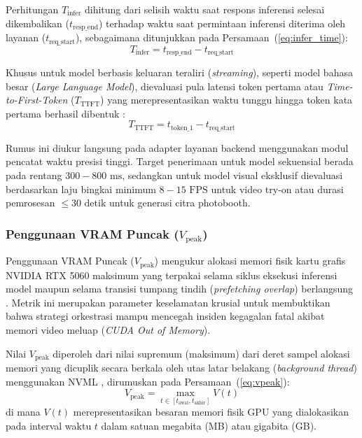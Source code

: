 Perhitungan $T_{\text{infer}}$ dihitung dari selisih waktu saat respons inferensi selesai dikembalikan ($t_{\text{resp\_end}}$) terhadap waktu saat permintaan inferensi diterima oleh layanan ($t_{\text{req\_start}}$), sebagaimana ditunjukkan pada Persamaan~(\ref{eq:infer_time}):
\begin{equation}
    T_{\text{infer}} = t_{\text{resp\_end}} - t_{\text{req\_start}}
    \label{eq:infer_time}
\end{equation}

Khusus untuk model berbasis keluaran teraliri (\textit{streaming}), seperti model bahasa besar (\textit{Large Language Model}), dievaluasi pula latensi token pertama atau \textit{Time-to-First-Token} ($T_{\text{TTFT}}$) yang merepresentasikan waktu tunggu hingga token kata pertama berhasil dibentuk \cite{zhang2025adaptive}:
\begin{equation}
    T_{\text{TTFT}} = t_{\text{token\_1}} - t_{\text{req\_start}}
    \label{eq:ttft}
\end{equation}

Rumus ini diukur langsung pada adapter layanan backend menggunakan modul pencatat waktu presisi tinggi. Target penerimaan untuk model sekuensial berada pada rentang $300 - 800\text{ ms}$, sedangkan untuk model visual eksklusif dievaluasi berdasarkan laju bingkai minimum $8 - 15\text{ FPS}$ untuk video try-on atau durasi pemrosesan $\le 30\text{ detik}$ untuk generasi citra photobooth.

\subsubsection{Penggunaan VRAM Puncak ($V_{\text{peak}}$)}
Penggunaan VRAM Puncak ($V_{\text{peak}}$) mengukur alokasi memori fisik kartu grafis NVIDIA RTX 5060 maksimum yang terpakai selama siklus eksekusi inferensi model maupun selama transisi tumpang tindih (\textit{prefetching overlap}) berlangsung \cite{woo2025exploring, min2023sensix}. Metrik ini merupakan parameter keselamatan krusial untuk membuktikan bahwa strategi orkestrasi mampu mencegah insiden kegagalan fatal akibat memori video meluap (\textit{CUDA Out of Memory}).

Nilai $V_{\text{peak}}$ diperoleh dari nilai supremum (maksimum) dari deret sampel alokasi memori yang dicuplik secara berkala oleh utas latar belakang (\textit{background thread}) menggunakan NVML \cite{nvidia2026containertoolkit}, dirumuskan pada Persamaan~(\ref{eq:vpeak}):
\begin{equation}
    V_{\text{peak}} = \max_{t \in [t_{\text{awal}}, t_{\text{akhir}}]} V(t)
    \label{eq:vpeak}
\end{equation}
di mana $V(t)$ merepresentasikan besaran memori fisik GPU yang dialokasikan pada interval waktu $t$ dalam satuan megabita (MB) atau gigabita (GB).

